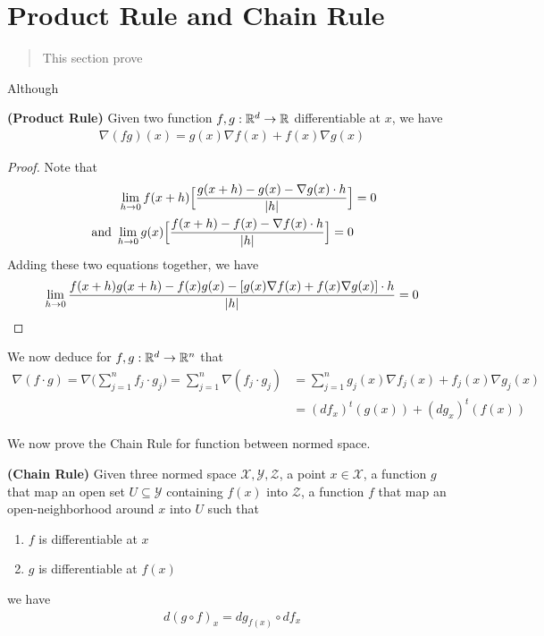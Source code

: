 \documentclass{report}
\begin{document}
\section{Product Rule and Chain Rule}
\begin{abstract}
This section prove   
\end{abstract}
\begin{mdframed}
Although 
\end{mdframed}
\begin{theorem}
\textbf{(Product Rule)} Given two function  $f,g:\mathbb{R}^d\rightarrow \mathbb{R}$ differentiable at $x$, we have 
\begin{align*}
\nabla (fg)(x)= g(x) \nabla f(x)+ f(x)\nabla g(x)
\end{align*}
\end{theorem}
\begin{proof}
Note that 
\begin{align*}
  \lim_{h\to 0}f(x+h)\Big[\frac{g(x+h)-g(x)-\nabla g(x)\cdot h}{\left|h\right|} \Big]&= 0 \\
  \text{ and }\lim_{h\to 0} g(x)\Big[ \frac{f(x+h)-f(x)-\nabla f(x)\cdot h}{\left|h\right|}\Big]=0
\end{align*}
Adding these two equations together, we have 
\begin{align*}
\lim_{h\to 0}  \frac{f(x+h)g(x+h)-f(x)g(x)-[g(x)\nabla f(x)+f(x)\nabla g(x)]\cdot h}{\left|h\right|}=0
\end{align*}
\end{proof}
\begin{mdframed}
We now deduce for $f,g:\mathbb{R}^d\rightarrow \mathbb{R}^n$ that 
\begin{align*}
\nabla (f\cdot g)=\nabla \Big(\sum_{j=1}^n f_j\cdot g_j\Big)=\sum_{j=1}^n \nabla (f_j\cdot g_j)&=\sum_{j=1}^n g_j(x)\nabla f_j(x)+f_j(x)\nabla g_j(x)\\
                                                                                                                 &=(df_x)^t(g(x))+(dg_x)^t(f(x))
\end{align*}
\end{mdframed}
\begin{mdframed}
We now prove the Chain Rule for function between normed space. 
\end{mdframed}
\begin{theorem}
\label{CR}
\textbf{(Chain Rule)} Given three normed space $\mathcal{X},\mathcal{Y},\mathcal{Z}$, a point $x \in \mathcal{X}$, a function $g$ that map an open set $U\subseteq \mathcal{Y}$ containing $f(x)$ into $\mathcal{Z}$, a function $f$ that map an open-neighborhood around $x$ into $U$ such that 
\begin{enumerate}[label=(\alph*)]
  \item $f$ is differentiable at $x$
   \item $g$ is differentiable at $f(x)$
\end{enumerate}
we have 
\begin{align*}
d(g\circ f)_x=dg_{f(x)}\circ df_{x}
\end{align*}
\end{theorem}
\end{document}
